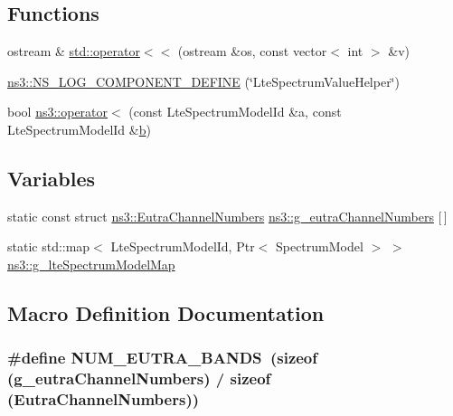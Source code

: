 \subsection*{Functions}
\begin{DoxyCompactItemize}
\item 
ostream \& \hyperlink{namespacestd_a0957ee82926700d8b55ff0f911cd8bc8}{std\+::operator$<$$<$} (ostream \&os, const vector$<$ int $>$ \&v)
\item 
\hyperlink{namespacens3_a541656dd8f35da9e2199a211ee7ccde3}{ns3\+::\+N\+S\+\_\+\+L\+O\+G\+\_\+\+C\+O\+M\+P\+O\+N\+E\+N\+T\+\_\+\+D\+E\+F\+I\+NE} (\char`\"{}Lte\+Spectrum\+Value\+Helper\char`\"{})
\item 
bool \hyperlink{namespacens3_a7986560f56046f8859bcfb52f7d39658}{ns3\+::operator$<$} (const Lte\+Spectrum\+Model\+Id \&a, const Lte\+Spectrum\+Model\+Id \&\hyperlink{lte__pathloss_8m_a21ad0bd836b90d08f4cf640b4c298e7c}{b})
\end{DoxyCompactItemize}
\subsection*{Variables}
\begin{DoxyCompactItemize}
\item 
static const struct \hyperlink{structns3_1_1EutraChannelNumbers}{ns3\+::\+Eutra\+Channel\+Numbers} \hyperlink{namespacens3_ac7b6277a31ba13b4793842a10a3d0f44}{ns3\+::g\+\_\+eutra\+Channel\+Numbers} \mbox{[}$\,$\mbox{]}
\item 
static std\+::map$<$ Lte\+Spectrum\+Model\+Id, Ptr$<$ Spectrum\+Model $>$ $>$ \hyperlink{namespacens3_a1e37494c3c56034a6030216a52f4be78}{ns3\+::g\+\_\+lte\+Spectrum\+Model\+Map}
\end{DoxyCompactItemize}


\subsection{Macro Definition Documentation}
\subsubsection[{\texorpdfstring{N\+U\+M\+\_\+\+E\+U\+T\+R\+A\+\_\+\+B\+A\+N\+DS}{NUM_EUTRA_BANDS}}]{\setlength{\rightskip}{0pt plus 5cm}\#define N\+U\+M\+\_\+\+E\+U\+T\+R\+A\+\_\+\+B\+A\+N\+DS~(sizeof (g\+\_\+eutra\+Channel\+Numbers) / sizeof (Eutra\+Channel\+Numbers))}\hypertarget{lte-spectrum-value-helper_8cc_a1a0cf1fbef963a28fb2985919229db33}{}\label{lte-spectrum-value-helper_8cc_a1a0cf1fbef963a28fb2985919229db33}
